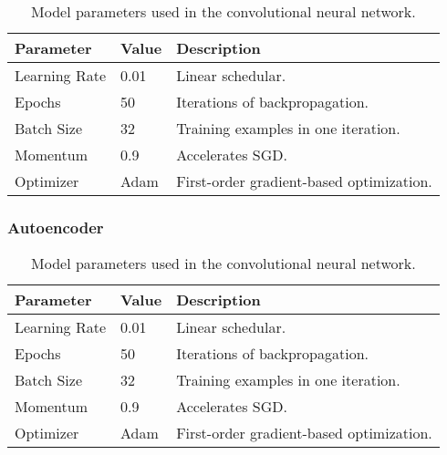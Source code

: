 \documentclass[12pt,english]{article}
\begin{document}
\begin{table}[ht]
\centering
\begin{tabular}{@{}lll@{}}
\toprule
\textbf{Parameter} & \textbf{Value} & \textbf{Description} \\ \midrule
Learning Rate & 0.01 & Linear schedular. \\
Epochs & 50 & Iterations of backpropagation. \\
Batch Size & 32 & Training examples in one iteration. \\
Momentum & 0.9 & Accelerates SGD. \\
Optimizer & Adam & First-order gradient-based optimization. \\
\bottomrule
\end{tabular}
\caption{Model parameters used in the convolutional neural network.}
\label{tab:model_params}
\end{table}

\subsubsection{Autoencoder}

\begin{table}[ht]
\centering
\begin{tabular}{@{}lll@{}}
\toprule
\textbf{Parameter} & \textbf{Value} & \textbf{Description} \\ \midrule
Learning Rate & 0.01 & Linear schedular. \\
Epochs & 50 & Iterations of backpropagation. \\
Batch Size & 32 & Training examples in one iteration. \\
Momentum & 0.9 & Accelerates SGD. \\
Optimizer & Adam & First-order gradient-based optimization. \\
\bottomrule
\end{tabular}
\caption{Model parameters used in the convolutional neural network.}
\label{tab:model_params}
\end{table}
{
}

\end{document}
